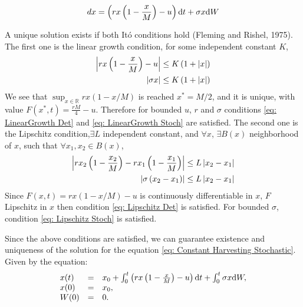 \begin{equation}
	dx=\left(rx\left(1-\frac{x}{M}\right)-u\right)\mathrm{d} t+\sigma x\mathrm{d} W \label{eq: Constant Harvesting Stochastic}
\end{equation}

A unique solution exists if both It\'o conditions hold (Fleming and Rishel, 1975). The first one is the linear growth condition, for some independent constant $K$,
\begin{align}
	\left|rx\left(1-\frac{x}{M}\right)-u\right|&\leq K\left(1+\left|x\right|\right) \label{eq: LinearGrowth Det}\\
	\left|\sigma x\right|&\leq K\left(1+\left|x\right|\right) \label{eq: LinearGrowth Stoch}
\end{align}
We see that $\sup_{x\in\mathbb{R}} rx(1-x/M)$ is reached $x^*=M/2$, and it is unique, with value $F(x^*,t)=\frac{rM}{4}-u$. Therefore for bounded $u$, $r$ and $\sigma$ conditions \ref{eq: LinearGrowth Det} and \ref{eq: LinearGrowth Stoch} are satisfied. The second one is the Lipschitz condition,$\exists L$ independent constant, and $\forall x$, $\exists B(x)$ neighborhood of $x$, such that $\forall x_1, x_2 \in B(x)$,
\begin{align}
\left|rx_2\left(1-\frac{x_2}{M}\right)-rx_1\left(1-\frac{x_1}{M}\right)\right|&\leq L \left|x_2-x_1\right| \label{eq: Lipschitz Det}\\
\left|\sigma\left(x_2-x_1\right)\right| &\leq L \left|x_2-x_1\right| \label{eq: Lipschitz Stoch}
\end{align}
Since $F(x,t)=rx(1-x/M)-u$ is continuously differentiable in $x$, $F$ Lipschitz in $x$ then condition \ref{eq: Lipschitz Det} is satisfied. For bounded $\sigma$, condition \ref{eq: Lipschitz Stoch} is satisfied.

Since the above conditions are satisfied, we can guarantee existence and uniqueness of the solution for the equation \ref{eq: Constant Harvesting Stochastic}. Given by the equation:
\begin{equation}
\begin{array}{lll}
	x(t)&=&x_0+\int_{0}^{t}\left(rx\left(1-\frac{x}{M}\right)-u\right)\mathrm{d} t + \int_{0}^{t}\sigma x \mathrm{d} W,\\
	x(0)&=&x_0, \\
	W(0)&=&0.
\end{array}
\end{equation}


